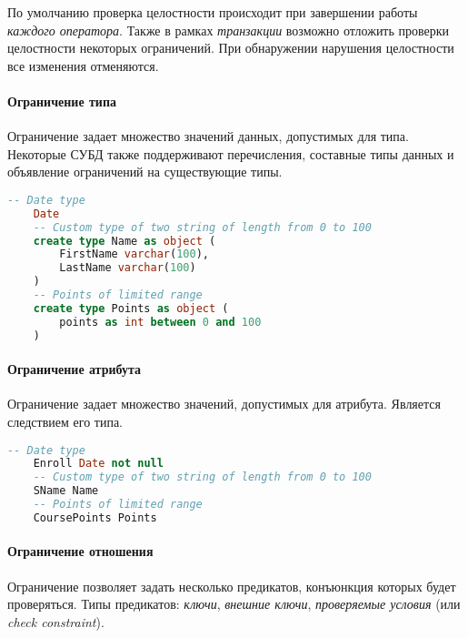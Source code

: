 По умолчанию проверка целостности происходит при завершении работы \textit{каждого оператора}. Также в
рамках \textit{транзакции} возможно отложить проверки целостности некоторых ограничений. При
обнаружении нарушения целостности все изменения отменяются.

\paragraph{Ограничение типа}

Ограничение задает множество значений данных, допустимых для типа. Некоторые СУБД также
поддерживают перечисления, составные типы данных и объявление ограничений на существующие типы.

\begin{examples}
	\enewline
	\begin{lstlisting}[language=SQL]
    -- Date type
    Date
    -- Custom type of two string of length from 0 to 100
    create type Name as object (
        FirstName varchar(100),
        LastName varchar(100)
    )
    -- Points of limited range
    create type Points as object (
        points as int between 0 and 100
    )
    \end{lstlisting}
\end{examples}

\paragraph{Ограничение атрибута}

Ограничение задает множество значений, допустимых для атрибута. Является следствием его типа.

\begin{examples}
	\enewline
	\begin{lstlisting}[language=SQL]
    -- Date type
    Enroll Date not null
    -- Custom type of two string of length from 0 to 100
    SName Name
    -- Points of limited range
    CoursePoints Points
    \end{lstlisting}
\end{examples}

\paragraph{Ограничение отношения}

Ограничение позволяет задать несколько предикатов, конъюнкция которых будет проверяться. Типы
предикатов: \textit{ключи}, \textit{внешние ключи}, \textit{проверяемые условия} (или
\textit{check constraint}).

